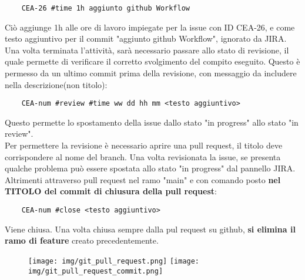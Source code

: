     \begin{lstlisting}
    CEA-26 #time 1h aggiunto github Workflow
    \end{lstlisting}
    Ciò aggiunge 1h alle ore di lavoro impiegate per la issue con ID CEA-26, e come testo aggiuntivo per il commit "aggiunto github Workflow", ignorato da JIRA.\\
    Una volta terminata l'attività, sarà necessario passare allo stato di revisione, il quale permette di verificare il corretto svolgimento del compito eseguito. Questo è permesso da un ultimo commit prima della revisione, con messaggio da includere nella descrizione(non titolo):
    \begin{lstlisting}
    CEA-num #review #time ww dd hh mm <testo aggiuntivo>
    \end{lstlisting}
    Questo permette lo spostamento della issue dallo stato "in progress" allo stato "in review".\\
    Per permettere la revisione è necessario aprire una pull request, il titolo deve corrispondere al nome del branch.
    Una volta revisionata la issue, se presenta qualche problema può essere spostata allo stato "in progress" dal pannello JIRA. Altrimenti attraverso pull request nel ramo "main" e con comando posto \textbf{nel TITOLO del commit di chiusura della pull request}:
    \begin{lstlisting}
    CEA-num #close <testo aggiuntivo>
    \end{lstlisting}
    Viene chiusa. Una volta chiusa sempre dalla pul request su github, \textbf{si elimina il ramo di feature} creato precedentemente.
    \begin{figure}[h!]
        \texttt{[image: img/git\_pull\_request.png]}
        \newline \texttt{[image: img/git\_pull\_request\_commit.png]}
    \end{figure}
    \clearpage

